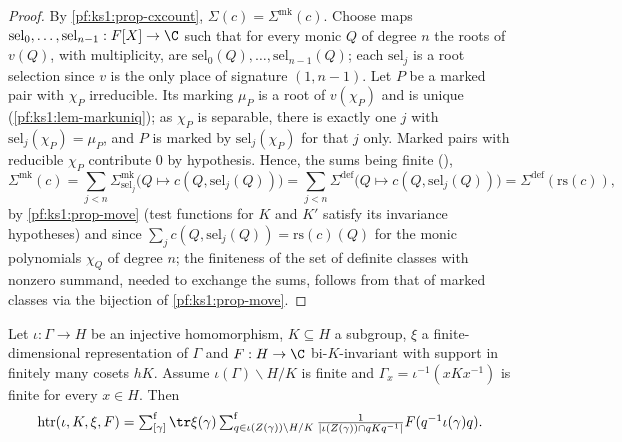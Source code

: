 \begin{proof}
By \cref{pf:ks1:prop-cxcount}, $\Sigma(c)=\Sigma^{\mathrm{mk}}(c)$. Choose maps $\mathrm{sel}_0,\dots,\mathrm{sel}_{n-1}:F[X]\to\C$ such that
for every monic $Q$ of degree $n$ the roots of $v(Q)$, with multiplicity, are $\mathrm{sel}_0(Q),\dots,\mathrm{sel}_{n-1}(Q)$; each
$\mathrm{sel}_j$ is a root selection since $v$ is the only place of signature $(1,n-1)$. Let $P$ be a marked pair with $\chi_P$
irreducible. Its marking $\mu_P$ is a root of $v(\chi_P)$ and is unique (\cref{pf:ks1:lem-markuniq}); as $\chi_P$ is separable, there is
exactly one $j$ with $\mathrm{sel}_j(\chi_P)=\mu_P$, and $P$ is marked by $\mathrm{sel}_j(\chi_P)$ for that $j$ only. Marked pairs with
reducible $\chi_P$ contribute $0$ by hypothesis. Hence, the sums being finite
(),
\[\Sigma^{\mathrm{mk}}(c)=\sum_{j<n}\Sigma^{\mathrm{mk}}_{\mathrm{sel}_j}\bigl(Q\mapsto c(Q,\mathrm{sel}_j(Q))\bigr)=
\sum_{j<n}\Sigma^{\mathrm{def}}\bigl(Q\mapsto c(Q,\mathrm{sel}_j(Q))\bigr)=\Sigma^{\mathrm{def}}(\mathrm{rs}(c)),\]
by \cref{pf:ks1:prop-move} (test functions for $K$ and $K'$ satisfy its invariance hypotheses) and since
$\sum_jc(Q,\mathrm{sel}_j(Q))=\mathrm{rs}(c)(Q)$ for the monic polynomials $\chi_Q$ of degree $n$; the finiteness of the set of definite
classes with nonzero summand, needed to exchange the sums, follows from that of marked classes via the bijection of
\cref{pf:ks1:prop-move}.
\end{proof}

\begin{lemma}\label{pf:ks1:lem-finitetrace}
Let $\iota:\Gamma\to H$ be an injective homomorphism, $K\subseteq H$ a subgroup, $\xi$ a finite-dimensional representation of $\Gamma$
and $F:H\to\C$ bi-$K$-invariant with support in finitely many cosets $hK$. Assume $\iota(\Gamma)\backslash H/K$ is finite and
$\Gamma_x=\iota^{-1}(xKx^{-1})$ is finite for every $x\in H$. Then
\[\mathrm{htr}(\iota,K,\xi,F)=\ksonefs_{[\gamma]}\tr\xi(\gamma)\ksonefs_{q\in\iota(Z(\gamma))\backslash H/K}
\frac{1}{|\iota(Z(\gamma))\cap qKq^{-1}|}F(q^{-1}\iota(\gamma)q).\]
\end{lemma}

